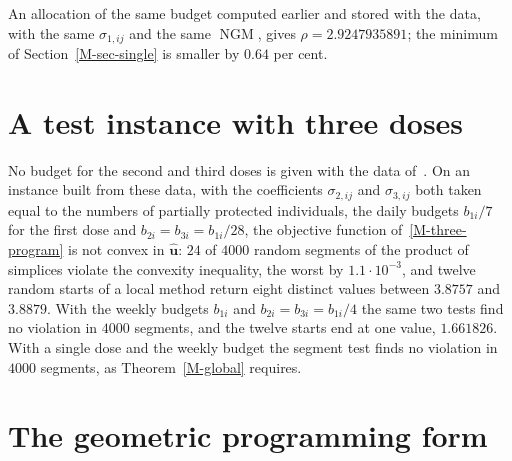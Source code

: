 \documentclass[11pt]{article}
\theoremstyle{plain}
\theoremstyle{remark}
\numberwithin{equation}{section}
\begin{document}
An allocation of the same budget computed earlier and stored with the data,
with the same $\sigma_{1,ij}$ and the same $\operatorname{NGM}$, gives
$\rho=2.9247935891$; the minimum of Section~\ref{M-sec-single} is smaller by
$0.64$ per cent.

\section{A test instance with three doses}\label{s-three}

No budget for the second and third doses is given with the data
of~\cite{JZh}. On an instance built from these data, with the coefficients
$\sigma_{2,ij}$ and $\sigma_{3,ij}$ both taken equal to the numbers of partially
protected individuals, the daily budgets $b_{1i}/7$ for the first dose and
$b_{2i}=b_{3i}=b_{1i}/28$, the objective function of~\eqref{M-three-program} is
not convex in $\widehat{\bm u}$: $24$ of $4000$ random segments of the
product of simplices violate the convexity inequality, the worst by
$1.1\cdot 10^{-3}$, and twelve random starts of a local method return eight
distinct values between $3.8757$ and $3.8879$. With the weekly budgets $b_{1i}$
and $b_{2i}=b_{3i}=b_{1i}/4$ the same two tests find no violation in $4000$
segments, and the twelve starts end at one value, $1.661826$. With a single
dose and the weekly budget the segment test finds no violation in $4000$
segments, as Theorem~\ref{M-global} requires.

\section{The geometric programming form}\label{s-gp}
\end{document}

